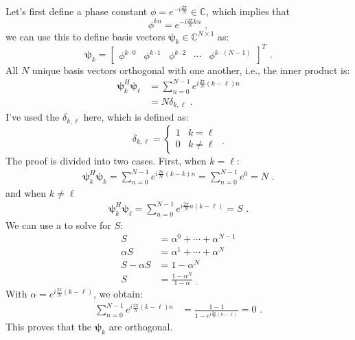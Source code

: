 Let's first define a phase constant $\phi=e^{-i\frac{2\pi}{N}}\in\mathbb{C}$, which implies that
\begin{equation}
  \phi^{kn} = e^{-i\frac{2\pi}{N}kn} \,\,,
\end{equation}
we can use this to define basis vectors $\bm{\psi}_k \in \mathbb{C}^{N \times 1}$ as:
\begin{equation}
  \bm{\psi}_k  = \begin{bmatrix}
    \phi^{k\cdot0} & \phi^{k\cdot1} & \phi^{k\cdot2} & \cdots & \phi^{k\cdot(N-1)}
  \end{bmatrix}^T \,\,.
\end{equation}
All $N$ unique basis vectors orthogonal with one another, i.e., the inner product is:
\begin{align}
  \bm{\psi}_k^H \bm{\psi}_{\ell} & = \sum_{n=0}^{N-1} e^{i\frac{2\pi}{N}(k-\ell)n} \\
                                 & = N \delta_{k,\ell} \,\,.
\end{align}
I've used the  $\delta_{k,\ell}$ here, which is defined as:
\begin{equation}
  \delta_{k,\ell}=\left\{
  \begin{array}{cc}
    1 & k=\ell     \\
    0 & k \ne \ell
  \end{array}\right.  \,\, _.
\end{equation}
The proof is divided into two cases. First, when $k=\ell$:
\begin{align}
  \bm{\psi}_k^H \bm{\psi}_{k} = \sum_{n=0}^{N-1}  e^{i\frac{2\pi}{N}(k-k)n} = \sum_{n=0}^{N-1} e^{0} = N \,\,.
\end{align}
and when $k\ne \ell$
\begin{align}
  \bm{\psi}_k^H  \bm{\psi}_{\ell} = \sum_{n=0}^{N-1} e^{i\frac{2\pi}{N}n(k-\ell)} = S \,\,.
\end{align}
We can use a  to solve for $S$:
\begin{align*}
  S          & = \alpha^0 + \cdots + \alpha^{N-1}    \\
  \alpha S   & = \alpha^1 + \cdots + \alpha^{N}      \\
  S-\alpha S & = 1 - \alpha^N                        \\
  S          & = \frac{1-\alpha^N}{1-\alpha} \,\, _.
\end{align*}
With $\alpha = e^{i\frac{2\pi}{N}(k-\ell)}$, we obtain:
\begin{align}
  \sum_{n=0}^{N-1} e^{i\frac{2\pi}{N}(k-\ell)n} & = \frac{1-1}{1-e^{i\frac{2\pi}{N}(k-\ell)}} = 0 \,\,.
\end{align}
This proves that the 
$\bm{\psi}_k$ are orthogonal.

